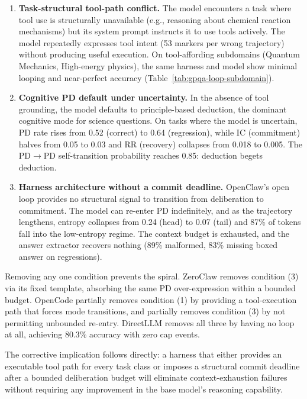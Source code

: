 \begin{enumerate}[leftmargin=*, itemsep=2pt]
\item \textbf{Task-structural tool-path conflict.}
  The model encounters a task where tool use is structurally unavailable (e.g.,
  reasoning about chemical reaction mechanisms) but its system prompt instructs
  it to use tools actively.
  The model repeatedly expresses tool intent (53 markers per wrong trajectory)
  without producing useful execution.
  On tool-affording subdomains (Quantum Mechanics, High-energy physics), the
  same harness and model show minimal looping and near-perfect accuracy
  (Table~\ref{tab:gpqa-loop-subdomain}).

\item \textbf{Cognitive PD default under uncertainty.}
  In the absence of tool grounding, the model defaults to principle-based
  deduction, the dominant cognitive mode for science questions.
  On tasks where the model is uncertain, PD rate rises from 0.52 (correct) to
  0.64 (regression), while IC (commitment) halves from 0.05 to 0.03 and RR
  (recovery) collapses from 0.018 to 0.005.
  The PD$\to$PD self-transition probability reaches 0.85: deduction begets
  deduction.

\item \textbf{Harness architecture without a commit deadline.}
  OpenClaw's open loop provides no structural signal to transition from
  deliberation to commitment.
  The model can re-enter PD indefinitely, and as the trajectory lengthens,
  entropy collapses from 0.24 (head) to 0.07 (tail) and 87\% of tokens fall
  into the low-entropy regime.
  The context budget is exhausted, and the answer extractor recovers nothing
  (89\% malformed, 83\% missing boxed answer on regressions).
\end{enumerate}

Removing any one condition prevents the spiral.
ZeroClaw removes condition (3) via its fixed template, absorbing the same PD
over-expression within a bounded budget.
OpenCode partially removes condition (1) by providing a tool-execution path that
forces mode transitions, and partially removes condition (3) by not permitting
unbounded re-entry.
DirectLLM removes all three by having no loop at all, achieving 80.3\% accuracy
with zero cap events.

The corrective implication follows directly: a harness that either provides an
executable tool path for every task class or imposes a structural commit
deadline after a bounded deliberation budget will eliminate context-exhaustion
failures without requiring any improvement in the base model's reasoning
capability.
